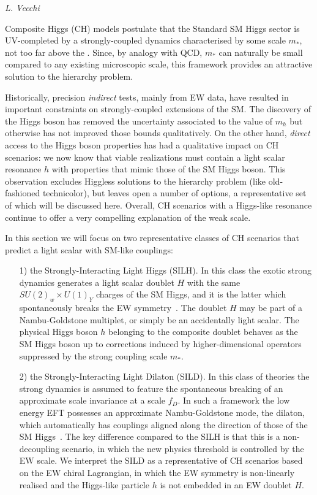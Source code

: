 \begin{center}
 {\it L. Vecchi}
\end{center}
\label{sec9:CHM}

Composite Higgs (CH) models postulate that the Standard SM Higgs sector is UV-completed by a strongly-coupled dynamics characterised by some scale $m_*$, not too far above the \UTeV. Since, by analogy with QCD, $m_*$ can naturally be small compared to any existing microscopic scale, this framework provides an attractive solution to the hierarchy problem. 

Historically, precision {\emph{indirect}} tests, mainly from EW data, have resulted in important constraints on strongly-coupled extensions of the SM. The discovery of the Higgs boson has removed the uncertainty associated to the value of $m_h$ but otherwise has not improved those bounds qualitatively. On the other hand, {\emph{direct}} access to the Higgs boson properties has had a qualitative impact on CH scenarios: we now know that viable realizations must contain a light scalar resonance $h$ with properties that mimic those of the SM Higgs boson. This observation excludes Higgless solutions to the hierarchy problem (like old-fashioned technicolor), but leaves open a number of options, a representative set of which will be discussed here. Overall, CH scenarios with a Higgs-like resonance continue to offer a very compelling explanation of the weak scale.




In this section we will focus on two representative classes of CH scenarios that predict a light scalar with SM-like couplings:
\begin{itemize}
\item[1)] the Strongly-Interacting Light Higgs (SILH). In this class the exotic strong dynamics generates a light scalar doublet $H$ with the same $SU(2)_w\times U(1)_Y$ charges of the SM Higgs, and it is the latter which spontaneously breaks the EW symmetry~\cite{Kaplan:1983fs, Kaplan:1983sm}. The doublet $H$ may be part of a Nambu-Goldstone multiplet, or simply be an accidentally light scalar. The physical Higgs boson $h$ belonging to the composite doublet behaves as the SM Higgs boson up to corrections induced by higher-dimensional operators suppressed by the strong coupling scale $m_*$. 
\item[2)] the Strongly-Interacting Light Dilaton (SILD). In this class of theories the strong dynamics is assumed to feature the spontaneous breaking of an approximate scale invariance at a scale $f_D$. In such a framework the low energy EFT possesses an approximate Nambu-Goldstone mode, the dilaton, which automatically has couplings aligned along the direction of those of the SM Higgs~\cite{Goldberger:2008zz}. The key difference compared to the SILH is that this is a non-decoupling scenario, in which the new physics threshold is controlled by the EW scale. We interpret the SILD as a representative of CH scenarios based on the EW chiral Lagrangian, in which the EW symmetry is non-linearly realised and the Higgs-like particle $h$ is not embedded in an EW doublet $H$. 
\end{itemize}



